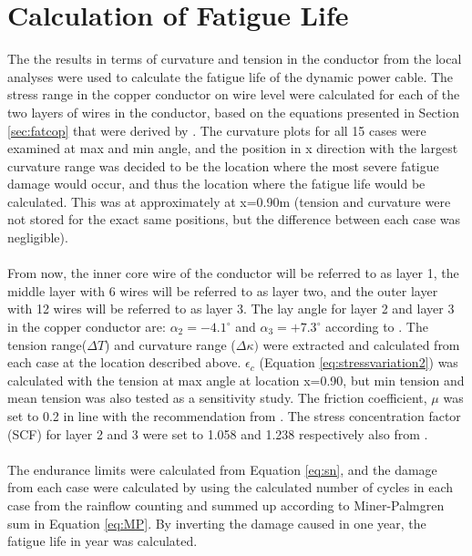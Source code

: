 \section{Calculation of Fatigue Life}
The the results in terms of curvature and tension in the conductor from the local analyses were used to calculate the fatigue life of the dynamic power cable. The stress range in the copper conductor on wire level were calculated for each of the two layers of wires in the conductor, based on the equations presented in Section \ref{sec:fatcop} that were derived by \cite{s300}. The curvature plots for all 15 cases were examined at max and min angle, and the position in x direction with the largest curvature range was decided to be the location where the most severe fatigue damage would occur, and thus the location where the fatigue life would be calculated. This was at approximately at x=0.90m (tension and curvature were not stored for the exact same positions, but the difference between each case was negligible). \\\\
From now, the inner core wire of the conductor will be referred to as layer 1, the middle layer with 6 wires will be referred to as layer two, and the outer layer with 12 wires will be referred to as layer 3. The lay angle for layer 2 and layer 3 in the copper conductor are: $\alpha_2=-4.1^\circ$ and $\alpha_3=+7.3^\circ$ according to \cite{Nasution2013}. The tension range($\Delta T$) and curvature range ($\Delta \kappa)$ were extracted and calculated from each case at the location described above. $\epsilon_c$ (Equation \ref{eq:stressvariation2}) was calculated with the tension at max angle at location x=0.90, but min tension and mean tension was also tested as a sensitivity study. The friction coefficient, $\mu$ was set to 0.2 in line with the recommendation from \cite{NASUTION2014}. The stress concentration factor (SCF) for layer 2 and 3 were set to 1.058 and 1.238 respectively also from \cite{NASUTION2014}. \\\\
The endurance limits were calculated from Equation \ref{eq:sn}, and the damage from each case were calculated by using the calculated number of cycles in each case from the rainflow counting and summed up according to Miner-Palmgren sum in Equation \ref{eq:MP}. By inverting the damage caused in one year, the fatigue life in year was calculated. 





